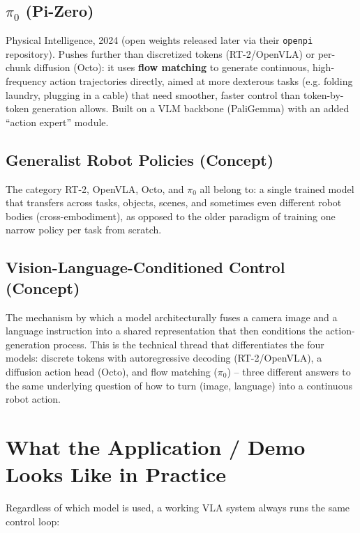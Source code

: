 \documentclass[a4paper,11pt]{article}
\begin{document}
\subsection{$\pi_0$ (Pi-Zero)}
Physical Intelligence, 2024 (open weights released later via their \texttt{openpi} repository). Pushes further than discretized tokens (RT-2/OpenVLA) or per-chunk diffusion (Octo): it uses \textbf{flow matching} to generate continuous, high-frequency action trajectories directly, aimed at more dexterous tasks (e.g. folding laundry, plugging in a cable) that need smoother, faster control than token-by-token generation allows. Built on a VLM backbone (PaliGemma) with an added ``action expert'' module.

\subsection{Generalist Robot Policies (Concept)}
The category RT-2, OpenVLA, Octo, and $\pi_0$ all belong to: a single trained model that transfers across tasks, objects, scenes, and sometimes even different robot bodies (cross-embodiment), as opposed to the older paradigm of training one narrow policy per task from scratch.

\subsection{Vision-Language-Conditioned Control (Concept)}
The mechanism by which a model architecturally fuses a camera image and a language instruction into a shared representation that then conditions the action-generation process. This is the technical thread that differentiates the four models: discrete tokens with autoregressive decoding (RT-2/OpenVLA), a diffusion action head (Octo), and flow matching (\(\pi_0\)) -- three different answers to the same underlying question of how to turn (image, language) into a continuous robot action.

\section{What the Application / Demo Looks Like in Practice}

Regardless of which model is used, a working VLA system always runs the same control loop:
\end{document}

